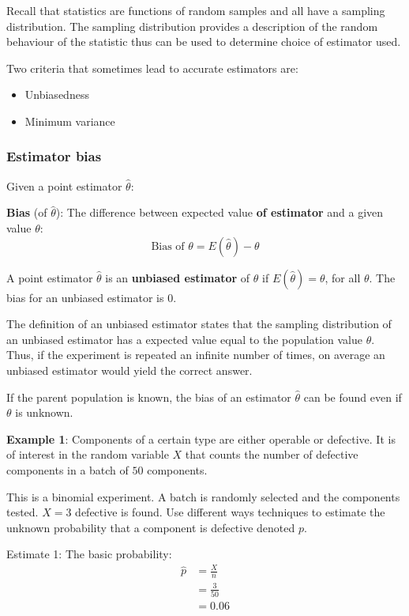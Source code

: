 \documentclass[10pt,a4paper]{article}
\begin{document}
Recall that statistics are functions of random samples and all have a sampling distribution. The
sampling distribution provides a description of the random behaviour of the statistic thus can be
used to determine choice of estimator used.

Two criteria that sometimes lead to accurate estimators are:
\begin{itemize}
    \item Unbiasedness
    \item Minimum variance
\end{itemize}

\subsubsection{Estimator bias}

Given a point estimator $\hat{\theta}$:
\begin{tcolorbox}[breakable,colback=white]
\textbf{Bias} (of $\hat{\theta}$): The difference between expected value \textbf{of estimator}
and a given value $\theta$:
$$
    \text{Bias of } \theta = E(\hat{\theta}) - \theta
$$

A point estimator $\hat{\theta}$ is an \textbf{unbiased estimator} of $\theta$ if $E(\hat{\theta}) = \theta$,
for all $\theta$. The bias for an unbiased estimator is $0$.
\end{tcolorbox}

The deﬁnition of an unbiased estimator states that the sampling distribution of an unbiased
estimator has a expected value equal to the population value $\theta$. Thus, if the experiment is repeated an
inﬁnite number of times, on average an unbiased estimator would yield the correct answer.

If the parent population is known, the bias of an estimator $\hat{\theta}$ can be found even if
$\theta$ is unknown.

\textbf{Example 1}: Components of a certain type are either operable or defective. It is of interest
in the random variable $X$ that counts the number of defective components in a batch of $50$ components.

This is a binomial experiment. A batch is randomly selected and the components tested. $X = 3$
defective is found. Use different ways techniques to estimate the unknown probability that a
component is defective denoted $p$.

Estimate 1: The basic probability:
\begin{align*}
    \hat{p} &= \frac{X}{n} \\
    &= \frac{3}{50} \\
    &= 0.06
\end{align*}
\end{document}
